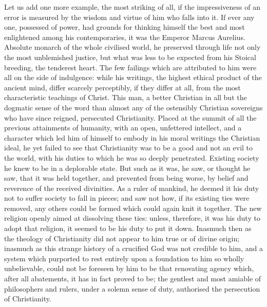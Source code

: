 \documentclass[11pt,openany]{book}
\begin{document}
Let us add one more example, the most striking of all, if the impressiveness of an error is measured by the wisdom and virtue of him who falls into it. If ever any one, possessed of power, had grounds for thinking himself the best and most enlightened among his contemporaries, it was the Emperor Marcus Aurelius. Absolute monarch of the whole civilised world, he preserved through life not only the most unblemished justice, but what was less to be expected from his Stoical breeding, the tenderest heart. The few failings which are attributed to him were all on the side of indulgence: while his writings, the highest ethical product of the ancient mind, differ scarcely perceptibly, if they differ at all, from the most characteristic teachings of Christ. This man, a better Christian in all but the dogmatic sense of the word than almost any of the ostensibly Christian sovereigns who have since reigned, persecuted Christianity. Placed at the summit of all the previous attainments of humanity, with an open, unfettered intellect, and a character which led him of himself to embody in his moral writings the Christian ideal, he yet failed to see that Christianity was to be a good and not an evil to the world, with his duties to which he was so deeply penetrated. Existing society he knew to be in a deplorable state. But such as it was, he saw, or thought he saw, that it was held together, and prevented from being worse, by belief and reverence of the received divinities. As a ruler of mankind, he deemed it his duty not to suffer society to fall in pieces; and saw not how, if its existing ties were removed, any others could be formed which could again knit it together. The new religion openly aimed at dissolving these ties: unless, therefore, it was his duty to adopt that religion, it seemed to be his duty to put it down. Inasmuch then as the theology of Christianity did not appear to him true or of divine origin; inasmuch as this strange history of a crucified God was not credible to him, and a system which purported to rest entirely upon a foundation to him so wholly unbelievable, could not be foreseen by him to be that renovating agency which, after all abatements, it has in fact proved to be; the gentlest and most amiable of philosophers and rulers, under a solemn sense of duty, authorised the persecution of Christianity.
\end{document}
